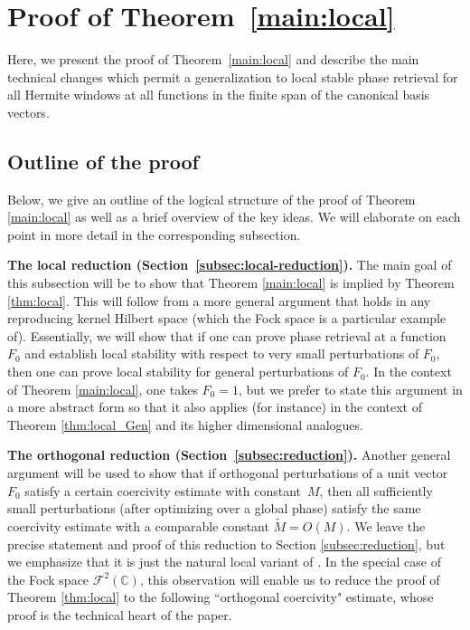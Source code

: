 \documentclass[11pt]{amsart}
\theoremstyle{remark}
\begin{document}
\section{Proof of Theorem~\ref{main:local}}
Here, we present the proof of Theorem~\ref{main:local} and describe the main technical changes which permit a generalization to local stable phase retrieval for all Hermite windows at all functions in the finite span of the canonical basis vectors. 

\subsection{Outline of the proof}\label{sec:strategy}
Below, we give an outline of the logical structure of the proof of Theorem \ref{main:local} as well as a brief overview of the key ideas. We will elaborate on each point in more detail in the corresponding subsection. 
\medskip

\noindent\textbf{The local reduction
(Section~\ref{subsec:local-reduction}).}\;
The main goal of this subsection will be to show that Theorem \ref{main:local} is implied by Theorem \ref{thm:local}. This will follow from a more general argument that holds in any reproducing kernel Hilbert space (which the Fock space is a particular example of). Essentially, we will show that if one
can prove phase retrieval at a function \(F_0\) and establish local stability
with respect to very small perturbations of \(F_0\), then one can prove local
stability for general perturbations of \(F_0\). In the context of Theorem \ref{main:local}, one takes $F_0=1$, but we prefer to state this argument in a more abstract form so that it also applies (for instance) in the context of Theorem \ref{thm:local_Gen} and its higher dimensional analogues. 
\medskip

\noindent
\textbf{The orthogonal reduction (Section~\ref{subsec:reduction}).}\;
Another general argument will be used to show that if orthogonal perturbations
of a unit vector $F_0$ satisfy a certain coercivity estimate with constant~$M$,
then all sufficiently small perturbations (after optimizing over a global
phase) satisfy the same coercivity estimate with a comparable constant $\widetilde{M} = O(M)$. We leave the precise statement and proof of this reduction to Section \ref{subsec:reduction}, but we emphasize that it is just the natural local variant of \cite[Theorem 3.10]{MR4800909}. In the special case of the Fock space $\mathcal{F}^2(\mathbb{C})$, this observation will enable us to reduce the proof of Theorem
\ref{thm:local} to the following ``orthogonal
coercivity" estimate, whose proof is the technical heart of the paper.
\end{document}
